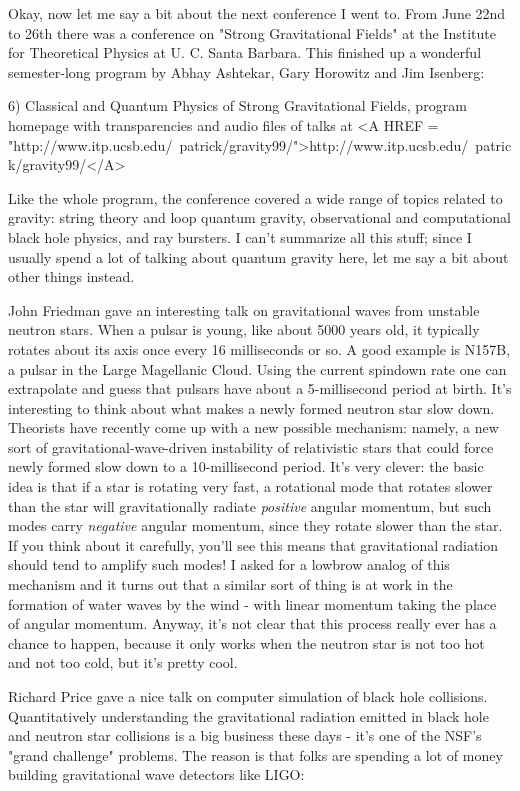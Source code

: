 Okay, now let me say a bit about the next conference I went to.  From
June 22nd to 26th there was a conference on "Strong Gravitational 
Fields" at the Institute for Theoretical Physics at U. C. Santa Barbara.
This finished up a wonderful semester-long program by Abhay Ashtekar, 
Gary Horowitz and Jim Isenberg:

6) Classical and Quantum Physics of Strong Gravitational Fields,
program homepage with transparencies and audio files of talks at
<A HREF = "http://www.itp.ucsb.edu/~patrick/gravity99/">http://www.itp.ucsb.edu/~patrick/gravity99/</A>

Like the whole program, the conference covered a wide range of
topics related to gravity: string theory and loop quantum gravity,
observational and computational black hole physics, and \gamma  ray
bursters.  I can't summarize all this stuff; since I usually spend 
a lot of talking about quantum gravity here, let me say a bit about 
other things instead.  

John Friedman gave an interesting talk on gravitational waves from
unstable neutron stars.  When a pulsar is young, like about 5000
years old, it typically rotates about its axis once every 16 
milliseconds or so.  A good example is N157B, a pulsar in the Large
Magellanic Cloud.  Using the current spindown rate one can extrapolate
and guess that pulsars have about a 5-millisecond period at birth.  
It's interesting to think about what makes a newly formed neutron
star slow down.  Theorists have recently come up with a new possible
mechanism: namely, a new sort of gravitational-wave-driven instability
of relativistic stars that could force newly formed slow down to a 
10-millisecond period.  It's very clever: the basic idea is that if
a star is rotating very fast, a rotational mode that rotates slower
than the star will gravitationally radiate \emph{positive} angular momentum,
but such modes carry \emph{negative} angular momentum, since they rotate
slower than the star.  If you think about it carefully, you'll see
this means that gravitational radiation should tend to amplify such 
modes!  I asked for a lowbrow analog of this mechanism and it turns 
out that a similar sort of thing is at work in the formation of water 
waves by the wind - with linear momentum taking the place of angular 
momentum.  Anyway, it's not clear that this process really ever has 
a chance to happen, because it only works when the neutron star is 
not too hot and not too cold, but it's pretty cool.  

Richard Price gave a nice talk on computer simulation of black 
hole collisions.  Quantitatively understanding the gravitational
radiation emitted in black hole and neutron star collisions is a 
big business these days - it's one of the NSF's "grand challenge" 
problems.  The reason is that folks are spending a lot of money 
building gravitational wave detectors like LIGO: 

